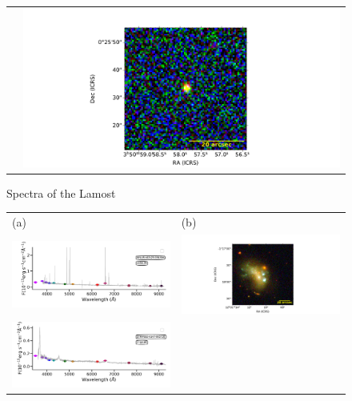 \documentclass[fleqn,usenatbib]{mnras}
\begin{document}
\begin{figure}
\begin{tabular}{ll}
    & \includegraphics[width=0.4\linewidth, trim=10 0 10 20, clip]{Figs/STRIPE82-0084-014280_57-0_80_r.pdf} \\
  \end{tabular}
  \caption{Spectra of the Lamost }
  \label{fig:color-diagram}
\end{figure}

\begin{figure}
  \setlength\tabcolsep{0pt}
  \begin{tabular}{ll}
    (a) & (b) \\
    \includegraphics[trim=10 0 10 20, clip]{Figs/spec-0331-52368-0449-SPLUS-n02s23-034336.pdf}
    & \includegraphics[width=0.4\linewidth, trim=10 0 10 20, clip]{Figs/SPLUS-n02s23-034336_180-1_200_r.pdf} \\
    \includegraphics[trim=10 0 10 20, clip]{Figs/spec-9152-58041-0463-STRIPE82-0147-005730.pdf}

\end{tabular}
\end{figure}
\end{document}
